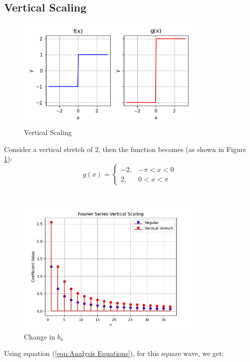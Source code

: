 \documentclass{article}
\begin{document}
\subsection{Vertical Scaling}
\begin{figure}[t]
    \centering
    \includegraphics[width=0.8\textwidth]{vertical_scaling.png}
    \caption{Vertical Scaling}
    \label{Vertical Scaling}
\end{figure}
Consider a vertical stretch of 2, then the function becomes (as shown in Figure \ref{Vertical Scaling}): 
\begin{equation}
g(x) = 
\begin{cases} 
-2, & -\pi < x < 0 \\
2, & 0 < x < \pi
\end{cases}
\end{equation}\\
\begin{figure}[h]
    \centering
    \includegraphics[width=0.8\textwidth]{vertical_stem_stretch.jpg}
    \caption{Change in $b_n$}
    \label{vertical_stem_stretch}
\end{figure}
Using equation (\ref{eqn:Analysis Equations}), for this square wave, we get:
\end{document}
